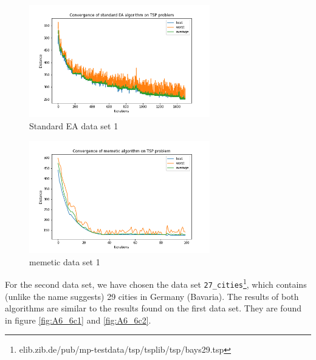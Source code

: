 \documentclass{article}
\begin{document}
\begin{enumerate}[label=\alph*)]
    \begin{figure}[H]
        \centering
        \includegraphics[width=0.7\textwidth]{Assignment 1/Figures/A1_6b1.png}
        \caption{Standard EA data set 1}
        \label{fig:A1_6b1}
    \end{figure}  
    \begin{figure}[H]
        \centering
        \includegraphics[width=0.7\textwidth]{Assignment 1/Figures/A1_6b2.png}
        \caption{memetic data set 1}
        \label{fig:A1_6b2}
    \end{figure}
    
    For the second data set, we have chosen the data set \texttt{27\_cities}\footnote{elib.zib.de/pub/mp-testdata/tsp/tsplib/tsp/bays29.tsp}, which contains (unlike the name suggests) 29 cities in Germany (Bavaria). The results of both algorithms are similar to the results found on the first data set. They are found in figure \ref{fig:A6_6c1} and \ref{fig:A6_6c2}.
   

\end{enumerate}
\end{document}
